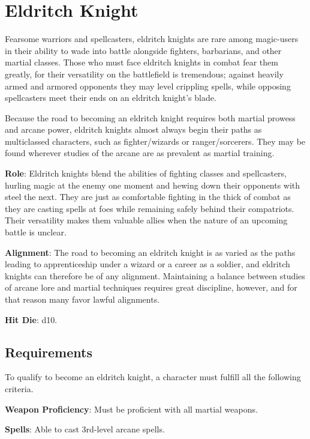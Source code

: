\section{Eldritch Knight}

\label{f0}				
Fearsome warriors and spellcasters, eldritch knights are rare among magic-users in their ability to wade into battle alongside fighters, barbarians, and other martial classes. Those who must face eldritch knights in combat fear them greatly, for their versatility on the battlefield is tremendous; against heavily armed and armored opponents they may level crippling spells, while opposing spellcasters meet their ends on an eldritch knight's blade.
				
Because the road to becoming an eldritch knight requires both martial prowess and arcane power, eldritch knights almost always begin their paths as multiclassed characters, such as fighter/wizards or ranger/sorcerers. They may be found wherever studies of the arcane are as prevalent as martial training.
				
\textbf{Role}: Eldritch knights blend the abilities of fighting classes and spellcasters, hurling magic at the enemy one moment and hewing down their opponents with steel the next. They are just as comfortable fighting in the thick of combat as they are casting spells at foes while remaining safely behind their compatriots. Their versatility makes them valuable allies when the nature of an upcoming battle is unclear.
				
\textbf{Alignment}: The road to becoming an eldritch knight is as varied as the paths leading to apprenticeship under a wizard or a career as a soldier, and eldritch knights can therefore be of any alignment. Maintaining a balance between studies of arcane lore and martial techniques requires great discipline, however, and for that reason many favor lawful alignments. 
				
\textbf{Hit Die}: d10.
				
\subsection{Requirements}

				
To qualify to become an eldritch knight, a character must fulfill all the following criteria.
				
\textbf{Weapon Proficiency}: Must be proficient with all martial weapons.
				
\textbf{Spells}: Able to cast 3rd-level arcane spells.
				
